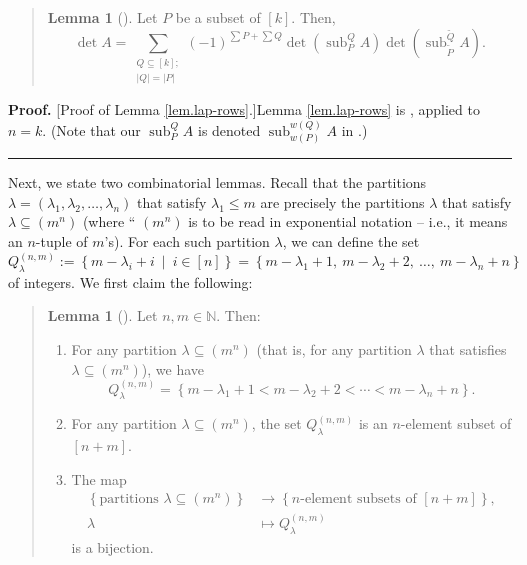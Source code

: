 \documentclass[numbers=enddot,12pt,final,onecolumn,notitlepage]{scrartcl}%
\newenvironment{statement}{\begin{quote}}{\end{quote}}
\theoremstyle{definition}
\newtheorem{lem}[theo]{Lemma}
\newenvironment{lemmain}[1][]
{\begin{statement}\begin{lem}[#1]}
{\end{lem}\end{statement}}
\newenvironment{proof}[1][Proof]{\noindent\textbf{#1.} }{\ \rule{0.5em}{0.5em}}
\newenvironment{lemmain}[1][Proof]{\noindent\textbf{#1.} }{\ \rule{0.5em}{0.5em}}
\let\sumnonlimits\sum
\renewcommand{\sum}{\sumnonlimits\limits}
\begin{document}
\begin{enumerate}
\begin{lemmain}
Let $P$ be a subset of $\left[  k\right]  $. Then,%
\[
\det A=\sum_{\substack{Q\subseteq\left[  k\right]  ;\\\left\vert Q\right\vert
=\left\vert P\right\vert }}\left(  -1\right)  ^{\sum P+\sum Q}\det\left(
\operatorname*{sub}\nolimits_{P}^{Q}A\right)  \det\left(  \operatorname*{sub}%
\nolimits_{\widetilde{P}}^{\widetilde{Q}}A\right)  .
\]

\end{lemmain}

\begin{proof}
[Proof of Lemma \ref{lem.lap-rows}.]Lemma \ref{lem.lap-rows} is \cite[Theorem
6.156]{detnotes}, applied to $n=k$. (Note that our $\operatorname*{sub}%
\nolimits_{P}^{Q}A$ is denoted $\operatorname*{sub}\nolimits_{w\left(
P\right)  }^{w\left(  Q\right)  }A$ in \cite{detnotes}.)
\end{proof}

Next, we state two combinatorial lemmas. Recall that the partitions
$\lambda=\left(  \lambda_{1},\lambda_{2},\ldots,\lambda_{n}\right)  $ that
satisfy $\lambda_{1}\leq m$ are precisely the partitions $\lambda$ that
satisfy $\lambda\subseteq\left(  m^{n}\right)  $ (where \textquotedblleft%
$\left(  m^{n}\right)  $ is to be read in exponential notation -- i.e., it
means an $n$-tuple of $m$'s). For each such partition $\lambda$, we can define
the set%
\[
Q_{\lambda}^{\left(  n,m\right)  }:=\left\{  m-\lambda_{i}+i\ \mid
\ i\in\left[  n\right]  \right\}  =\left\{  m-\lambda_{1}+1,\ m-\lambda
_{2}+2,\ \ldots,\ m-\lambda_{n}+n\right\}
\]
of integers. We first claim the following:

\begin{lemmain}
\label{lem.Qlam1}Let $n,m\in\mathbb{N}$. Then:

\begin{enumerate}
\item[\textbf{(a)}] For any partition $\lambda\subseteq\left(  m^{n}\right)  $
(that is, for any partition $\lambda$ that satisfies $\lambda\subseteq\left(
m^{n}\right)  $), we have
\[
Q_{\lambda}^{\left(  n,m\right)  }=\left\{  m-\lambda_{1}+1<m-\lambda
_{2}+2<\cdots<m-\lambda_{n}+n\right\}  .
\]


\item[\textbf{(b)}] For any partition $\lambda\subseteq\left(  m^{n}\right)
$, the set $Q_{\lambda}^{\left(  n,m\right)  }$ is an $n$-element subset of
$\left[  n+m\right]  $.

\item[\textbf{(c)}] The map%
\begin{align*}
\left\{  \text{partitions }\lambda\subseteq\left(  m^{n}\right)  \right\}   &
\rightarrow\left\{  n\text{-element subsets of }\left[  n+m\right]  \right\}
,\\
\lambda &  \mapsto Q_{\lambda}^{\left(  n,m\right)  }%
\end{align*}
is a bijection.
\end{enumerate}
\end{lemmain}


\end{enumerate}
\end{document}

